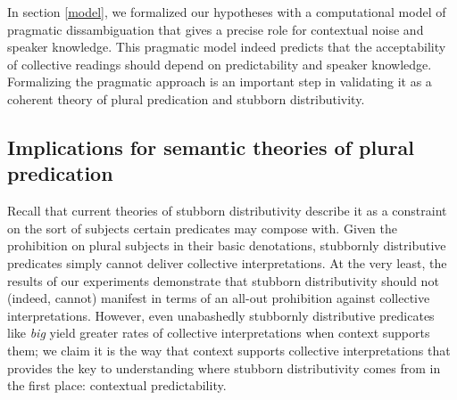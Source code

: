 \documentclass[preprint,12pt,authoryear,titlepage]{elsarticle}
\newcommand{\ndg}[1]{\textcolor{Green}{[ndg: #1]}}
\begin{document}
In section \ref{model}, we formalized our hypotheses with a computational model of pragmatic dissambiguation that gives a precise role for contextual noise and speaker knowledge. This pragmatic model indeed predicts that the acceptability of collective readings should depend on predictability and speaker knowledge. Formalizing the pragmatic approach is an important step in validating it as a coherent theory of plural predication and  stubborn distributivity.


\subsection{Implications for semantic theories of plural predication}



Recall that current theories of stubborn distributivity describe it as a constraint on the sort of subjects certain predicates may compose with. 
Given the prohibition on plural subjects in their basic denotations, stubbornly distributive predicates simply cannot deliver collective interpretations. At the very least, the results of our experiments demonstrate that stubborn distributivity should not (indeed, cannot) manifest in terms of an all-out prohibition against collective interpretations. However, even unabashedly stubbornly distributive predicates like \emph{big} yield greater rates of collective interpretations when context supports them; we claim it is the way that context supports collective interpretations that provides the key to understanding where stubborn distributivity comes from in the first place: contextual predictability.
\end{document}
